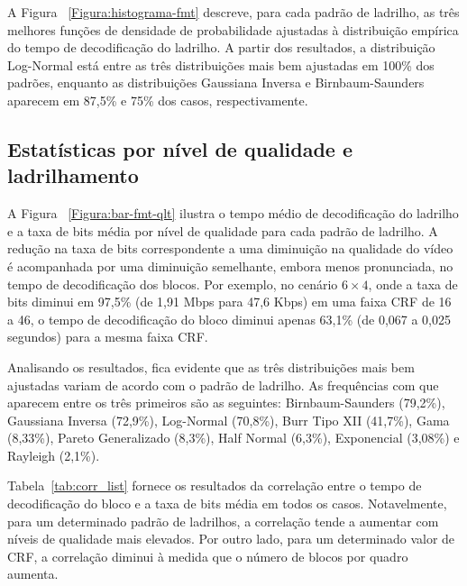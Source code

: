 {A Figura ~\ref{Figura:histograma-fmt} descreve, para cada padrão de ladrilho, as três melhores funções de densidade de probabilidade ajustadas à distribuição empírica do tempo de decodificação do ladrilho. A partir dos resultados, a distribuição Log-Normal está entre as três distribuições mais bem ajustadas em 100\% dos padrões, enquanto as distribuições Gaussiana Inversa e Birnbaum-Saunders aparecem em 87,5\% e 75\% dos casos, respectivamente.


\subsection{Estatísticas por nível de qualidade e ladrilhamento}

A Figura ~\ref{Figura:bar-fmt-qlt} ilustra o tempo médio de decodificação do ladrilho e a taxa de bits média por nível de qualidade para cada padrão de ladrilho. A redução na taxa de bits correspondente a uma diminuição na qualidade do vídeo é acompanhada por uma diminuição semelhante, embora menos pronunciada, no tempo de decodificação dos blocos. Por exemplo, no cenário $6 \times 4$, onde a taxa de bits diminui em 97,5\% (de 1,91 Mbps para 47,6 Kbps) em uma faixa CRF de 16 a 46, o tempo de decodificação do bloco diminui apenas 63,1\% (de 0,067 a 0,025 segundos) para a mesma faixa CRF.

Analisando os resultados, fica evidente que as três distribuições mais bem ajustadas variam de acordo com o padrão de ladrilho. As frequências com que aparecem entre os três primeiros são as seguintes: Birnbaum-Saunders (79,2\%), Gaussiana Inversa (72,9\%), Log-Normal (70,8\%), Burr Tipo XII (41,7\%), Gama (8,33\%), Pareto Generalizado (8,3\%), Half Normal (6,3\%), Exponencial (3,08\%) e Rayleigh (2,1\%).


Tabela~\ref{tab:corr_list} fornece os resultados da correlação entre o tempo de decodificação do bloco e a taxa de bits média em todos os casos. Notavelmente, para um determinado padrão de ladrilhos, a correlação tende a aumentar com níveis de qualidade mais elevados. Por outro lado, para um determinado valor de CRF, a correlação diminui à medida que o número de blocos por quadro aumenta.

}
